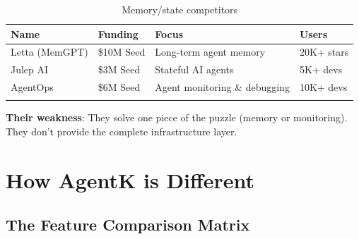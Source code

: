 \documentclass[12pt,a4paper,openany]{report}
\begin{document}
\begin{longtable}{p{3cm}p{3cm}p{4cm}p{3cm}}
\toprule
\textbf{Name} & \textbf{Funding} & \textbf{Focus} & \textbf{Users} \\
\midrule
Letta (MemGPT) & \$10M Seed & Long-term agent memory & 20K+ stars \\
Julep AI & \$3M Seed & Stateful AI agents & 5K+ devs \\
AgentOps & \$6M Seed & Agent monitoring \& debugging & 10K+ devs \\
\bottomrule
\caption{Memory/state competitors}
\end{longtable}

\textbf{Their weakness}: They solve one piece of the puzzle (memory or monitoring). They don't provide the complete infrastructure layer.


\chapter{How AgentK is Different}

\section{The Feature Comparison Matrix}
\end{document}
